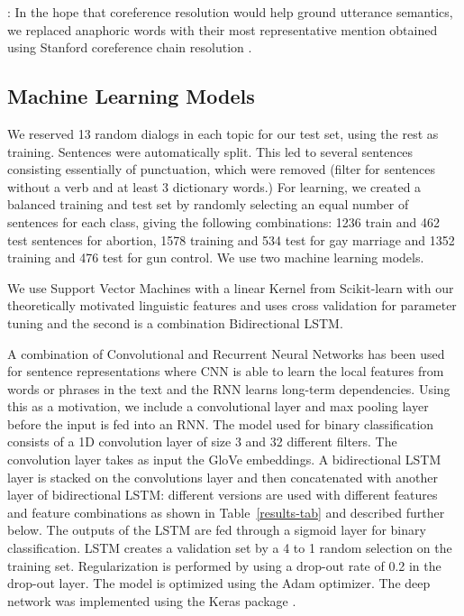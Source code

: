 \documentclass[11pt]{article}
\begin{document}
: In the hope that coreference resolution would
help ground utterance semantics, we replaced anaphoric words with
their most representative mention obtained using Stanford coreference
chain resolution \cite{manning-EtAl:2014:P14-5}.

\subsection{Machine Learning Models}
\label{sec-ml-results}
We reserved 13 random dialogs in each topic for our test set, using
the rest as training. Sentences were automatically split. This led to
several sentences consisting essentially of punctuation, which were
removed (filter for sentences without a verb and at least 3 dictionary
words.) For learning, we created a balanced training and test set by
randomly selecting an equal number of sentences for each class, giving
the following combinations: 1236 train and 462 test sentences for
abortion, 1578 training and 534 test for gay marriage and 1352
training and 476 test for gun control. We 
use two machine learning models. 

  We use Support Vector Machines with a linear
Kernel from Scikit-learn \cite{Pedregosaetal11} with our theoretically
motivated linguistic features and uses cross validation for parameter
tuning and the second is a combination Bidirectional
LSTM. 

  A combination of Convolutional and
Recurrent Neural Networks has been used for sentence representations
\cite{Wang2016CombinationOC} where CNN is able to learn the local
features from words or phrases in the text and the RNN learns
long-term dependencies. Using this as a motivation, we include a
convolutional layer and max pooling layer before the input is fed into
an RNN. The model used for binary classification consists of a 1D
convolution layer of size 3 and 32 different filters. The convolution
layer takes as input the GloVe embeddings. A bidirectional LSTM layer
is stacked on the convolutions layer and then concatenated with
another layer of bidirectional LSTM: different versions are used with
different features and feature combinations as shown in
Table~\ref{results-tab} and described further below. The outputs of
the LSTM are fed through a sigmoid layer for binary
classification. LSTM creates a validation set by a 4 to 1 random
selection on the training set. Regularization is performed by using a
drop-out rate of 0.2 in the drop-out layer.  The model is optimized
using the Adam \cite{kingma2014adam} optimizer. The deep network was
implemented using the Keras package \cite{chollet2015keras}.
\end{document}
